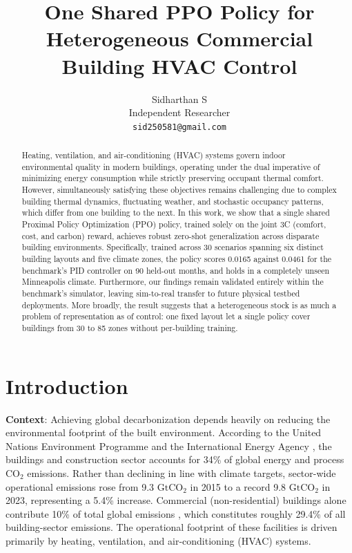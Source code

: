 \documentclass{article}
\title{One Shared PPO Policy for Heterogeneous Commercial Building HVAC Control}
\author{%
  Sidharthan S \\
  Independent Researcher \\
  \texttt{sid250581@gmail.com} \\
}
\begin{document}
\nocite{goldfeder2024smart,goldfeder2026smart}


\maketitle


\begin{abstract}
Heating, ventilation, and air-conditioning (HVAC) systems govern indoor environmental quality in modern buildings, operating under the dual imperative of minimizing energy consumption while strictly preserving occupant thermal comfort. However, simultaneously satisfying these objectives remains challenging due to complex building thermal dynamics, fluctuating weather, and stochastic occupancy patterns, which differ from one building to the next. In this work, we show that a single shared Proximal Policy Optimization (PPO) policy, trained solely on the joint 3C (comfort, cost, and carbon) reward, achieves robust zero-shot generalization across disparate building environments. Specifically, trained across 30 scenarios spanning six distinct building layouts and five climate zones, the policy scores 0.0165 against 0.0461 for the benchmark's PID controller on 90 held-out months, and holds in a completely unseen Minneapolis climate. Furthermore, our findings remain validated entirely within the benchmark's simulator, leaving sim-to-real transfer to future physical testbed deployments. More broadly, the result suggests that a heterogeneous stock is as much a problem of representation as of control: one fixed layout let a single policy cover buildings from 30 to 85 zones without per-building training.
\end{abstract}


\section{Introduction}

\textbf{Context}: Achieving global decarbonization depends heavily on reducing the environmental footprint of the built environment. According to the United Nations Environment Programme \citep{unep2025buildings} and the International Energy Agency \citep{iea2018futureofcooling}, the buildings and construction sector accounts for 34\% of global energy and process $\text{CO}_2$ emissions. Rather than declining in line with climate targets, sector-wide operational emissions rose from 9.3 $\text{GtCO}_2$ in 2015 to a record 9.8 $\text{GtCO}_2$ in 2023, representing a 5.4\% increase. Commercial (non-residential) buildings alone contribute 10\% of total global emissions \citep{eia2018cbecs}, which constitutes roughly 29.4\% of all building-sector emissions. The operational footprint of these facilities is driven primarily by heating, ventilation, and air-conditioning (HVAC) systems.
\end{document}
